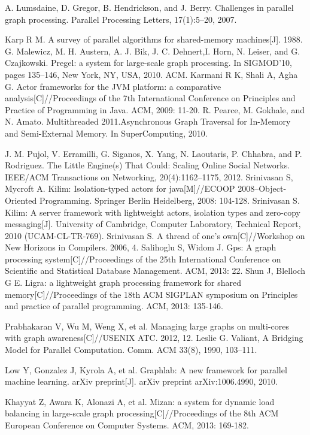 \documentclass[twocolumn,a4paper,10pt]{article}
\begin{document}
\begin{thebibliography}{00}
    A. Lumsdaine, D. Gregor, B. Hendrickson, and J. Berry. Challenges in parallel graph processing. Parallel Processing Letters, 17(1):5–20, 2007.
    
    Karp R M. A survey of parallel algorithms for shared-memory machines[J]. 1988.
    G. Malewicz, M. H. Austern, A. J. Bik, J. C. Dehnert,I. Horn, N. Leiser, and G. Czajkowski. Pregel: a system for large-scale graph processing. In SIGMOD’10, pages 135–146, New York, NY, USA, 2010. ACM.
    Karmani R K, Shali A, Agha G. Actor frameworks for the JVM platform: a comparative analysis[C]//Proceedings of the 7th International Conference on Principles and Practice of Programming in Java. ACM, 2009: 11-20.
R. Pearce, M. Gokhale, and N. Amato. Multithreaded 2011.Asynchronous Graph Traversal for In-Memory and Semi-External Memory. In SuperComputing, 2010.

    J. M. Pujol, V. Erramilli, G. Siganos, X. Yang, N. Laoutaris, P. Chhabra, and P. Rodriguez. The Little Engine(s) That Could: Scaling Online Social Networks. IEEE/ACM Transactions on Networking, 20(4):1162–1175, 2012.
    Srinivasan S, Mycroft A. Kilim: Isolation-typed actors for java[M]//ECOOP 2008–Object-Oriented Programming. Springer Berlin Heidelberg, 2008: 104-128.
Srinivasan S. Kilim: A server framework with lightweight actors, isolation types and zero-copy messaging[J]. University of Cambridge, Computer Laboratory, Technical Report, 2010 (UCAM-CL-TR-769).
Srinivasan S. A thread of one’s own[C]//Workshop on New Horizons in Compilers. 2006, 4.
    Salihoglu S, Widom J. Gps: A graph processing system[C]//Proceedings of the 25th International Conference on Scientific and Statistical Database Management. ACM, 2013: 22.
	Shun J, Blelloch G E. Ligra: a lightweight graph processing framework for shared memory[C]//Proceedings of the 18th ACM SIGPLAN symposium on Principles and practice of parallel programming. ACM, 2013: 135-146.

Prabhakaran V, Wu M, Weng X, et al. Managing large graphs on multi-cores with graph awareness[C]//USENIX ATC. 2012, 12.
Leslie G. Valiant, A Bridging Model for Parallel Computation. Comm. ACM 33(8), 1990, 103–111.

Low Y, Gonzalez J, Kyrola A, et al. Graphlab: A new framework for parallel machine learning. arXiv preprint[J]. arXiv preprint arXiv:1006.4990, 2010.

Khayyat Z, Awara K, Alonazi A, et al. Mizan: a system for dynamic load balancing in large-scale graph processing[C]//Proceedings of the 8th ACM European Conference on Computer Systems. ACM, 2013: 169-182.

\end{thebibliography}
\end{document}
